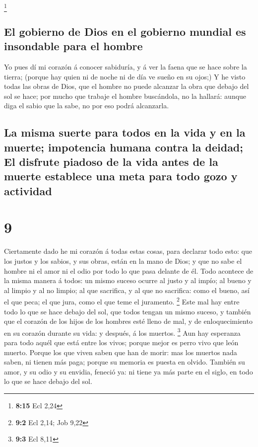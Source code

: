 \footnote{\textbf{8:15} Ecl 2,24}

\hypertarget{el-gobierno-de-dios-en-el-gobierno-mundial-es-insondable-para-el-hombre}{%
\subsection{El gobierno de Dios en el gobierno mundial es insondable
para el
hombre}\label{el-gobierno-de-dios-en-el-gobierno-mundial-es-insondable-para-el-hombre}}

 Yo pues dí mi corazón á conocer sabiduría, y á ver la
faena que se hace sobre la tierra; (porque hay quien ni de noche ni de
día ve sueño en su ojos;)  Y he visto todas las obras de
Dios, que el hombre no puede alcanzar la obra que debajo del sol se
hace; por mucho que trabaje el hombre buscándola, no la hallará: aunque
diga el sabio que la sabe, no por eso podrá alcanzarla.

\hypertarget{la-misma-suerte-para-todos-en-la-vida-y-en-la-muerte-impotencia-humana-contra-la-deidad-el-disfrute-piadoso-de-la-vida-antes-de-la-muerte-establece-una-meta-para-todo-gozo-y-actividad}{%
\subsection{La misma suerte para todos en la vida y en la muerte;
impotencia humana contra la deidad; El disfrute piadoso de la vida antes
de la muerte establece una meta para todo gozo y
actividad}\label{la-misma-suerte-para-todos-en-la-vida-y-en-la-muerte-impotencia-humana-contra-la-deidad-el-disfrute-piadoso-de-la-vida-antes-de-la-muerte-establece-una-meta-para-todo-gozo-y-actividad}}

\hypertarget{section-8}{%
\section{9}\label{section-8}}

 Ciertamente dado he mi corazón á todas estas cosas, para
declarar todo esto: que los justos y los sabios, y sus obras, están en
la mano de Dios; y que no sabe el hombre ni el amor ni el odio por todo
lo que pasa delante de él.  Todo acontece de la misma
manera á todos: un mismo suceso ocurre al justo y al impío; al bueno y
al limpio y al no limpio; al que sacrifica, y al que no sacrifica: como
el bueno, así el que peca; el que jura, como el que teme el juramento.
\footnote{\textbf{9:2} Ecl 2,14; Job 9,22}  Este mal hay
entre todo lo que se hace debajo del sol, que todos tengan un mismo
suceso, y también que el corazón de los hijos de los hombres esté lleno
de mal, y de enloquecimiento en su corazón durante su vida: y después, á
los muertos. \footnote{\textbf{9:3} Ecl 8,11}  Aun hay
esperanza para todo aquél que está entre los vivos; porque mejor es
perro vivo que león muerto.  Porque los que viven saben
que han de morir: mas los muertos nada saben, ni tienen más paga; porque
su memoria es puesta en olvido.  También su amor, y su
odio y su envidia, feneció ya: ni tiene ya más parte en el siglo, en
todo lo que se hace debajo del sol.

